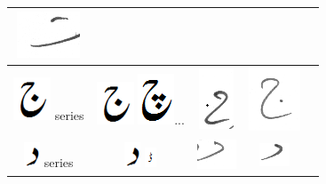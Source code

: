 \documentclass[a4paper,conference]{IEEEtran}
\begin{document}
\begin{table}[h]
\begin{tabular}{@{}ccccc@{}}
\includegraphics[scale=0.15]{6} \\ 
\hline
\includegraphics[scale=0.25]{jeeem} series & \includegraphics[scale=0.25]{jeeem} \includegraphics[scale=0.25]{chay_orig}... & \includegraphics[scale=0.20]{7} &
\includegraphics[scale=0.15]{8} &  \\ 
\hline
\includegraphics[scale=0.25]{daal_orig} series & \includegraphics[scale=0.25]{daal_orig} \includegraphics[scale=0.25]{dal} & \includegraphics[scale=0.20]{9} &
\includegraphics[scale=0.25]{10} & \\ 
\hline

\end{tabular}
\end{table}
\end{document}
